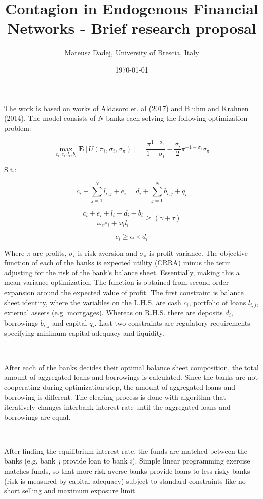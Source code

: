\documentclass{article}
\title{Contagion in Endogenous Financial Networks - Brief research proposal}
\author{Mateusz Dadej, University of Brescia, Italy}
\date{\today}
\begin{document}
\maketitle

The work is based on works of Aldasoro et. al (2017) and Bluhm and Krahnen (2014). The model consists of $N$ banks each solving the following optimization problem:

\[\max_{c_i, e_i, l_i, b_i} \mathbf{E}[U(\pi_i, \sigma_i, \sigma_\pi)] = \frac{\pi^{1-\sigma_i}}{1 - \sigma_i} - \frac{\sigma_i}{2} \pi^{-1-\sigma_i} \sigma_\pi\]

S.t.:

\[c_i + \sum_{j=1}^{N}l_{i,j} + e_i = d_i + \sum_{j=1}^{N}b_{i,j} + q_i\]

\[\frac{c_i + e_i + l_i - d_i - b_i}{\omega_e e_i + \omega_l l_i} \geq (\gamma + \tau)\]

\[c_i \geq \alpha \times d_i\]   

Where $\pi$ are profits, $\sigma_i$ is risk aversion and $\sigma_{\pi}$ is profit variance. The objective function of each of the banks is expected utility (CRRA) minus the term adjusting for the risk of the bank's balance sheet. Essentially, making this a mean-variance optimization. The function is obtained from second order expansion around the expected value of profit.
The first constraint is balance sheet identity, where the variables on the L.H.S. are cash $c_i$, portfolio of loans $l_{i,j}$, external assets (e.g. mortgages). Whereas on R.H.S. there are deposits $d_i$, borrowings $b_{i,j}$ and capital $q_i$. Last two constraints are regulatory requirements specifying minimum capital adequacy and liquidity.

\

After each of the banks decides their optimal balance sheet composition, the total amount of aggregated loans and borrowings is calculated. Since the banks are not cooperating during optimization step, the amount of aggregated loans and borrowing is different. The clearing process is done with algorithm that iteratively changes interbank interest rate until the aggregated loans and borrowings are equal.

\

After finding the equilibrium interest rate, the funds are matched between the banks (e.g. bank $j$ provide loan to bank $i$). Simple linear programming exercise matches funds, so that more risk averse banks provide loans to less risky banks (risk is measured by capital adequacy) subject to standard constraints like no-short selling and maximum exposure limit.
\end{document}
